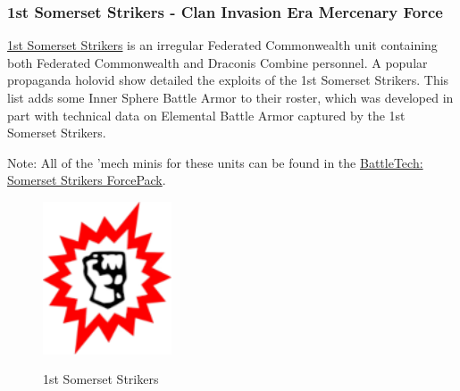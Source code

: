 \subsubsection{1st Somerset Strikers - Clan Invasion Era Mercenary Force}

\href{https://www.sarna.net/wiki/1st_Somerset_Strikers}{1st Somerset Strikers} is an irregular Federated Commonwealth unit containing both Federated Commonwealth and Draconis Combine personnel.
A popular propaganda holovid show detailed the exploits of the 1st Somerset Strikers.
This list adds some Inner Sphere Battle Armor to their roster, which was developed in part with technical data on Elemental Battle Armor captured by the 1st Somerset Strikers.

Note: All of the 'mech minis for these units can be found in the  \href{https://www.sarna.net/wiki/BattleTech:_Somerset_Strikers_ForcePack}{BattleTech: Somerset Strikers ForcePack}.

\begin{figure}[!h]
  \centering
  \includegraphics[alt='1st Somerset Strikers Logo', width=1.5in, height=1.778in]{img/1st-Somerset-Strikers.png}
  \caption*{1st Somerset Strikers}
\end{figure}

